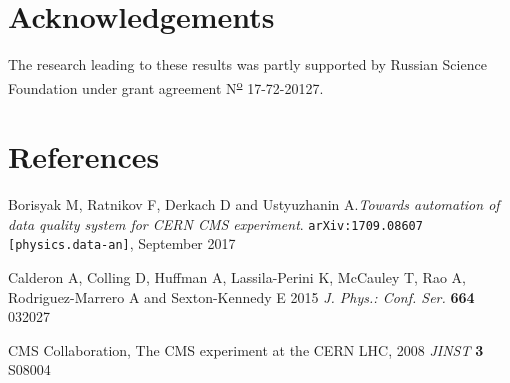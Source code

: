 \documentclass[a4paper]{jpconf}
\begin{document}
\section*{Acknowledgements}
The research leading to these results was partly supported by Russian Science Foundation under grant agreement N\textsuperscript{\underline{\scriptsize o}} 17-72-20127.

\section*{References}
\begin{thebibliography}{3}
\item Borisyak M, Ratnikov F, Derkach D and Ustyuzhanin A.{\it Towards automation of data quality system for CERN CMS experiment}.  {\tt arXiv:1709.08607 [physics.data-an]}, September 2017

\item  Calderon A, Colling D, Huffman A, Lassila-Perini K, McCauley T, Rao A, Rodriguez-Marrero A and Sexton-Kennedy E 2015 {\it J. Phys.: Conf. Ser.} {\bf 664} 032027

\item  CMS Collaboration, The CMS experiment at the CERN LHC, 2008 {\it JINST} {\bf 3} S08004
\end{thebibliography}
\end{document}
